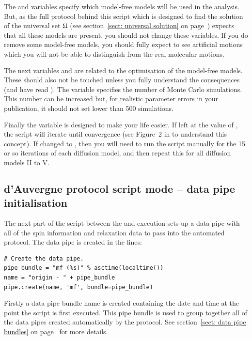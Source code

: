 \begin{htmlonly}
\begin{htmlonly}
The  and   variables specify which model-free models will be used in the analysis.  But, as the full protocol behind this script which is designed to find the solution of the universal set $\mathfrak{U}$ (see section~\ref{sect: universal solution} on page~\pageref{sect: universal solution}) expects that all these models are present, you should not change these variables.  If you do remove some model-free models, you should fully expect to see artificial motions which you will not be able to distinguish from the real molecular motions.

The next variables  and  are related to the optimisation of the model-free models.  These should also not be touched unless you fully understand the consequences (and have read \citet{dAuvergneGooley08a}).  The variable  specifies the number of Monte Carlo simulations.  This number can be increased but, for realistic parameter errors in your publication, it should not set lower than 500 simulations.

Finally the  variable is designed to make your life easier.  If left at the value of , the script will iterate until convergence (see Figure~2 in \citet{dAuvergneGooley08b} to understand this concept).  If changed to , then you will need to run the script manually for the 15 or so iterations of each diffusion model, and then repeat this for all diffusion models II to V.



\subsection{d'Auvergne protocol script mode -- data pipe initialisation}

The next part of the script between the  and execution sets up a data pipe with all of the spin information and relaxation data to pass into the automated protocol.  The data pipe is created in the lines:

\begin{lstlisting}[firstnumber=156]
# Create the data pipe.
pipe_bundle = "mf (%s)" % asctime(localtime())
name = "origin - " + pipe_bundle
pipe.create(name, 'mf', bundle=pipe_bundle)
\end{lstlisting}

Firstly a data pipe bundle name is created containing the date and time at the point the script is first executed.  This pipe bundle is used to group together all of the data pipes created automatically by the protocol.  See section~\ref{sect: data pipe bundles} on page~\pageref{sect: data pipe bundles} for more details.


\end{htmlonly}
\end{htmlonly}
